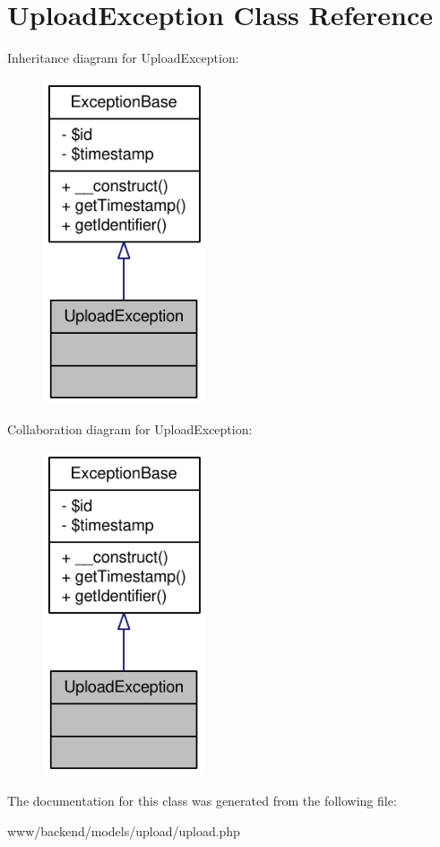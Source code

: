 \hypertarget{classUploadException}{
\section{UploadException Class Reference}
\label{classUploadException}
}


Inheritance diagram for UploadException:\nopagebreak
\begin{figure}[H]
\begin{center}
\leavevmode
\includegraphics[width=136pt]{classUploadException__inherit__graph}
\end{center}
\end{figure}


Collaboration diagram for UploadException:\nopagebreak
\begin{figure}[H]
\begin{center}
\leavevmode
\includegraphics[width=136pt]{classUploadException__coll__graph}
\end{center}
\end{figure}


The documentation for this class was generated from the following file:\begin{DoxyCompactItemize}
\item 
www/backend/models/upload/upload.php\end{DoxyCompactItemize}
